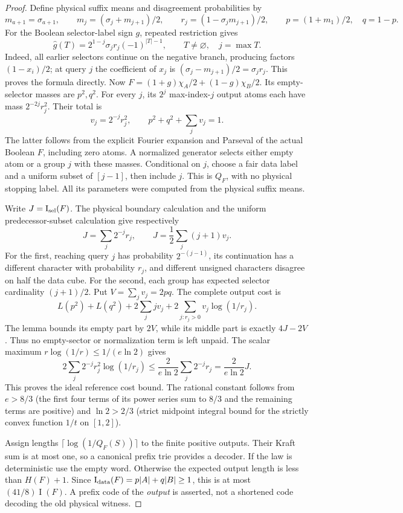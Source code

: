 \documentclass{article}
\newcommand{\I}{\operatorname{I}}
\begin{document}
\begin{proof}
Define physical suffix means and disagreement probabilities by
\[
 m_{a+1}=\sigma_{a+1},\qquad
 m_j=(\sigma_j+m_{j+1})/2,\qquad
 r_j=(1-\sigma_jm_{j+1})/2,
 \qquad p=(1+m_1)/2,\quad q=1-p.
\]
For the Boolean selector-label sign $g$, repeated restriction gives
\[
 \widehat g(T)=2^{1-j}\sigma_jr_j(-1)^{|T|-1},
 \qquad T\ne\varnothing,\quad j=\max T.
\]
Indeed, all earlier selectors continue on the negative branch, producing
factors $(1-x_i)/2$; at query $j$ the coefficient of $x_j$ is
$(\sigma_j-m_{j+1})/2=\sigma_jr_j$. This proves the formula directly.
Now $F=(1+g)\chi_A/2+(1-g)\chi_B/2$. Its empty-selector masses are
$p^2,q^2$. For every $j$, its $2^j$ max-index-$j$ output atoms each have
mass $2^{-2j}r_j^2$. Their total is
\[
 v_j=2^{-j}r_j^2,
 \qquad p^2+q^2+\sum_j v_j=1.
\]
The latter follows from the explicit Fourier expansion and Parseval of
the actual Boolean $F$, including zero atoms. A normalized generator
selects either empty atom or a group $j$ with these masses. Conditional
on $j$, choose a fair data label and a uniform subset of $[j-1]$, then
include $j$. This is $Q_F$, with no physical stopping label. All its
parameters were computed from the physical suffix means.

Write $J=\I_{\rm sel}(F)$. The physical boundary calculation and the
uniform predecessor-subset calculation give respectively
\[
 J=\sum_j2^{-j}r_j,
 \qquad J=\frac12\sum_j(j+1)v_j.
\]
For the first, reaching query $j$ has probability $2^{-(j-1)}$, its
continuation has a different character with probability $r_j$, and
different unsigned characters disagree on half the data cube. For the
second, each group has expected selector cardinality $(j+1)/2$.
Put $V=\sum_jv_j=2pq$. The complete output cost is
\[
 L(p^2)+L(q^2)+2\sum_j jv_j
       +2\sum_{j:r_j>0}v_j\log(1/r_j).
\]
The lemma bounds its empty part by $2V$, while its middle part is exactly
$4J-2V$. Thus no empty-sector or normalization term is left unpaid.
The scalar maximum $r\log(1/r)\le1/(e\ln2)$ gives
\[
 2\sum_j2^{-j}r_j^2\log(1/r_j)
 \le\frac{2}{e\ln2}\sum_j2^{-j}r_j
 =\frac{2}{e\ln2}J.
\]
This proves the ideal reference cost bound. The rational constant follows
from $e>8/3$ (the first four terms of its power series sum to $8/3$ and
the remaining terms are positive) and $\ln2>2/3$ (strict midpoint
integral bound for the strictly convex function $1/t$ on $[1,2]$).

Assign lengths $\lceil\log(1/Q_F(S))\rceil$ to the finite positive
outputs. Their Kraft sum is at most one, so a canonical prefix trie
provides a decoder. If the law is deterministic use the empty word.
Otherwise the expected output length is less than $H(F)+1$. Since
$\I_{\rm data}(F)=p|A|+q|B|\ge1$, this is at most
$(41/8)\I(F)$. A prefix code of the \emph{output} is asserted, not a
shortened code decoding the old physical witness.
\end{proof}
\end{document}
